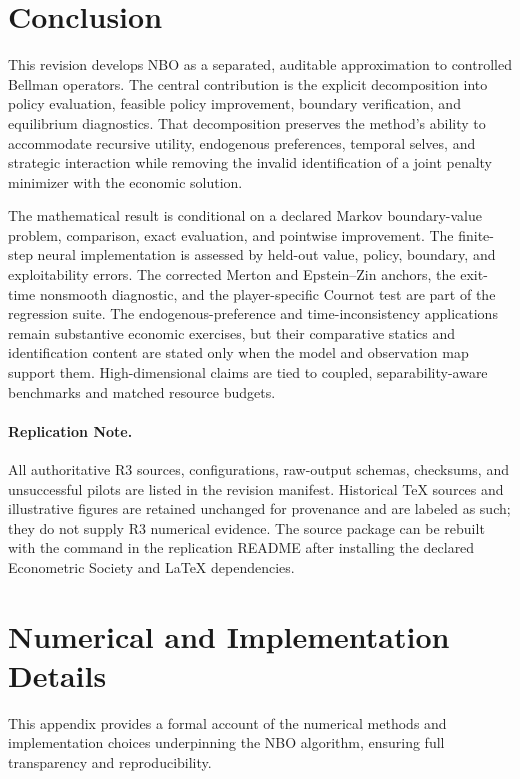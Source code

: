 \documentclass[ecta]{econsocart}
\theoremstyle{plain}
\theoremstyle{remark}
\begin{document}
\section{Conclusion} \label{sec:conclusion}
This revision develops NBO as a separated, auditable approximation to controlled Bellman operators. The central contribution is the explicit decomposition into policy evaluation, feasible policy improvement, boundary verification, and equilibrium diagnostics. That decomposition preserves the method's ability to accommodate recursive utility, endogenous preferences, temporal selves, and strategic interaction while removing the invalid identification of a joint penalty minimizer with the economic solution.

The mathematical result is conditional on a declared Markov boundary-value problem, comparison, exact evaluation, and pointwise improvement. The finite-step neural implementation is assessed by held-out value, policy, boundary, and exploitability errors. The corrected Merton and Epstein--Zin anchors, the exit-time nonsmooth diagnostic, and the player-specific Cournot test are part of the regression suite. The endogenous-preference and time-inconsistency applications remain substantive economic exercises, but their comparative statics and identification content are stated only when the model and observation map support them. High-dimensional claims are tied to coupled, separability-aware benchmarks and matched resource budgets.

\paragraph*{Replication Note.} All authoritative R3 sources, configurations, raw-output schemas, checksums, and unsuccessful pilots are listed in the revision manifest. Historical TeX sources and illustrative figures are retained unchanged for provenance and are labeled as such; they do not supply R3 numerical evidence. The source package can be rebuilt with the command in the replication README after installing the declared Econometric Society and LaTeX dependencies.

\section{Numerical and Implementation Details}
\label{app:implementation}

This appendix provides a formal account of the numerical methods and implementation choices underpinning the NBO algorithm, ensuring full transparency and reproducibility.
\end{document}

